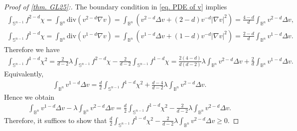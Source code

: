 \documentclass[12pt]{amsart}
\numberwithin{equation}{section}
\numberwithin{lemma}{section}
\numberwithin{proposition}{section}
\numberwithin{corollary}{section}
\numberwithin{remark}{section}
\begin{document}
\begin{proof}[Proof of \cref{thm. GL25}:]
    The boundary  condition in \cref{eq. PDE of v} implies
    \begin{align*}
        \int_{\mathbb{S}^{n-1}}f^{2-d}\chi
        =\int_{\mathbb{B}^n}\mathrm{div}(v^{2-d}\nabla v)
        =\int_{\mathbb{B}^n}(v^{2-d}\Delta v+(2-d)v^{-d}|\nabla v|^2)
        =\frac{4-d}{d}\int_{\mathbb{B}^n}v^{2-d}\Delta v,\\
        \int_{\mathbb{S}^{n-1}}f^{1-d}\chi
        =\int_{\mathbb{B}^n}\mathrm{div}(v^{1-d}\nabla v)
        =\int_{\mathbb{B}^n}(v^{1-d}\Delta v+(1-d)v^{-d}|\nabla v|^2)
        =\frac{2-d}{d}\int_{\mathbb{B}^n}v^{1-d}\Delta v.
    \end{align*}
    Therefore we have
    \begin{align*}
        \int_{\mathbb{S}^{n-1}}f^{1-d}\chi^2
        =\frac{2}{d-2}\lambda\int_{\mathbb{S}^{n-1}}f^{2-d}\chi
        -\frac{2}{d-2}\int_{\mathbb{S}^{n-1}}f^{1-d}\chi
        =\frac{2(4-d)}{d(d-2)}\lambda\int_{\mathbb{B}^n} v^{2-d}\Delta v+\frac{2}{d}\int_{\mathbb{B}^n}v^{1-d}\Delta v.
    \end{align*}
    Equivalently,
    \begin{align*}
        \int_{\mathbb{B}^n}v^{1-d}\Delta v
        =\frac{d}{2}\int_{\mathbb{S}^{n-1}}f^{1-d}\chi^2
        +\frac{d-4}{d-2}\lambda\int_{\mathbb{B}^n}v^{2-d}\Delta v.
    \end{align*}
    Hence we obtain
    \begin{align*}
        \int_{\mathbb{B}^n}v^{1-d}\Delta v-\lambda \int_{\mathbb{B}^n}v^{2-d}\Delta v
        =\frac{d}{2}\int_{\mathbb{S}^{n-1}}f^{1-d}\chi^2-\frac{2}{d-2}\lambda\int_{\mathbb{B}^n}v^{2-d}\Delta v.
    \end{align*}
Therefore, it suffices to show that $\frac{d}{2}\int_{\mathbb{S}^{n-1}}f^{1-d}\chi^2-\frac{2}{d-2}\lambda\int_{\mathbb{B}^n}v^{2-d}\Delta v\geq 0$.


\end{proof}
\end{document}
